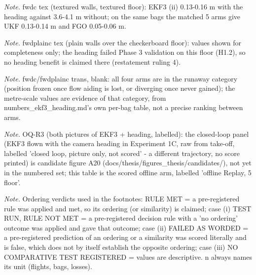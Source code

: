 \begin{table}[htbp]
\textit{Note.} fwdc tex (textured walls, textured floor): EKF3 (ii) 0.13-0.16 m with the heading against 3.6-4.1 m without; on the same bags the matched 5\textdegree{} arms give UKF 0.13-0.14 m and FGO 0.05-0.06 m.\par
\textit{Note.} fwdplainc tex (plain walls over the checkerboard floor): values shown for completeness only; the heading failed Phase 3 validation on this floor (H1.2), so no heading benefit is claimed there (restatement ruling 4).\par
\textit{Note.} fwdc/fwdplainc trans, blank: all four arms are in the runaway category (position frozen once flow aiding is lost, or diverging once never gained); the metre-scale values are evidence of that category, from numbers\_ekf3\_heading.md's own per-bag table, not a precise ranking between arms.\par
\textit{Note.} OQ-R3 (both pictures of EKF3 + heading, labelled): the closed-loop panel (EKF3 flown with the camera heading in Experiment 1C, raw from take-off, labelled 'closed loop, picture only, not scored' - a different trajectory, no score printed) is candidate figure A20 (docs/thesis/figures\_thesis/candidates/), not yet in the numbered set; this table is the scored offline arm, labelled 'offline Replay, 5\textdegree{} floor'.\par
\textit{Note.} Ordering verdicts used in the footnotes: RULE MET = a pre-registered rule was applied and met, so its ordering (or similarity) is claimed; case (i) TEST RUN, RULE NOT MET = a pre-registered decision rule with a 'no ordering' outcome was applied and gave that outcome; case (ii) FAILED AS WORDED = a pre-registered prediction of an ordering or a similarity was scored literally and is false, which does not by itself establish the opposite ordering; case (iii) NO COMPARATIVE TEST REGISTERED = values are descriptive. n always names its unit (flights, bags, losses).\par
\end{table}
